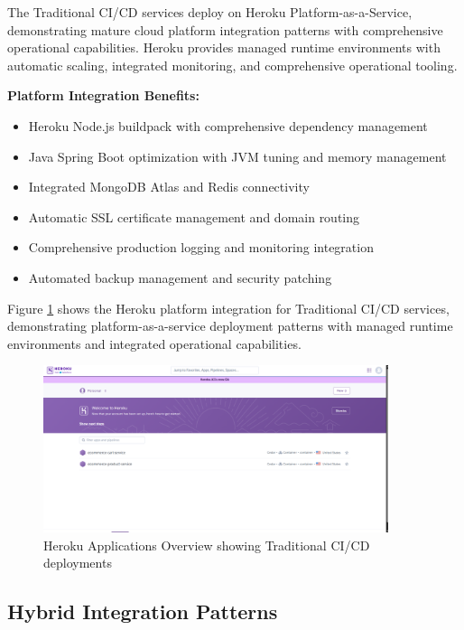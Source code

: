 The Traditional CI/CD services deploy on Heroku Platform-as-a-Service, demonstrating mature cloud platform integration patterns with comprehensive operational capabilities. Heroku provides managed runtime environments with automatic scaling, integrated monitoring, and comprehensive operational tooling.

\textbf{Platform Integration Benefits:}
\begin{itemize}
\item Heroku Node.js buildpack with comprehensive dependency management
\item Java Spring Boot optimization with JVM tuning and memory management
\item Integrated MongoDB Atlas and Redis connectivity
\item Automatic SSL certificate management and domain routing
\item Comprehensive production logging and monitoring integration
\item Automated backup management and security patching
\end{itemize}

Figure \ref{fig:heroku-apps-overview} shows the Heroku platform integration for Traditional CI/CD services, demonstrating platform-as-a-service deployment patterns with managed runtime environments and integrated operational capabilities.

\begin{figure}[H]
\centering
\includegraphics[width=0.9\textwidth]{figures/chapter4/heroku-apps-overview.png}
\caption{Heroku Applications Overview showing Traditional CI/CD deployments}
\label{fig:heroku-apps-overview}
\end{figure}

\subsection{Hybrid Integration Patterns}

